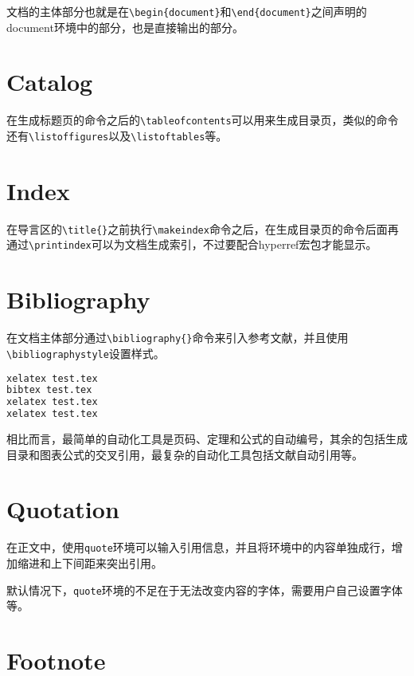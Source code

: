 文档的主体部分也就是在\texttt{\textbackslash begin\{document\}}和\texttt{\textbackslash end\{document\}}之间声明的document环境中的部分，也是直接输出的部分。

\section{Catalog}

在生成标题页的命令之后的\texttt{\textbackslash tableofcontents}可以用来生成目录页，类似的命令还有\texttt{\textbackslash listoffigures}以及\texttt{\textbackslash listoftables}等。


\section{Index}


在导言区的\texttt{\textbackslash title\{\}}之前执行\texttt{\textbackslash makeindex}命令之后，在生成目录页的命令后面再通过\texttt{\textbackslash printindex}可以为文档生成索引，不过要配合hyperref宏包才能显示。



\section{Bibliography}

在文档主体部分通过\texttt{\textbackslash bibliography\{\}}命令来引入参考文献，并且使用\texttt{\textbackslash bibliographystyle}设置样式。


\begin{lstlisting}[language=TeX]
xelatex test.tex
bibtex test.tex
xelatex test.tex
xelatex test.tex
\end{lstlisting}


相比而言，最简单的自动化工具是页码、定理和公式的自动编号，其余的包括生成目录和图表公式的交叉引用，最复杂的自动化工具包括文献自动引用等。

\section{Quotation}

在正文中，使用\texttt{quote}环境可以输入引用信息，并且将环境中的内容单独成行，增加缩进和上下间距来突出引用。

默认情况下，\texttt{quote}环境的不足在于无法改变内容的字体，需要用户自己设置字体等。


\section{Footnote}

